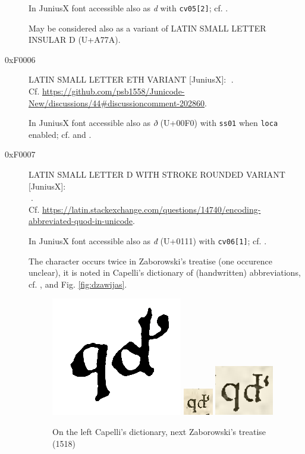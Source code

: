 \documentclass{article}
\newcommand{\Jglyph}[1]{{\relsize{2}\J#1}}
\begin{document}
\begin{description}
  In JuniusX font accessible also as \textit{d} with \texttt{cv05[2]};
  cf. \autocite[p. 7]{baker20:_opent_featur_junius_junius}.

  May be considered also as a variant of LATIN SMALL LETTER INSULAR D (U+A77A).
% 

\item [0xF0006] LATIN SMALL LETTER ETH VARIANT [JuniusX]: 
  \Jglyph{󰀆}.\\ Cf. \url{https://github.com/psb1558/Junicode-New/discussions/44#discussioncomment-202860}.

  In JuniusX font accessible also as \textit{ð} (U+00F0) with
  \texttt{ss01} when \texttt{loca} enabled;
  cf. \autocite[p. 11]{baker20:_opent_featur_junius_junius} and
  \autocite[p. 4 (30)]{kenmcd20:_junius_user_guide_first_draft}.

\item [0xF0007] LATIN SMALL LETTER D WITH STROKE ROUNDED VARIANT [JuniusX]:\\
  \Jglyph{󰀇}.\\
  Cf. \url{https://latin.stackexchange.com/questions/14740/encoding-abbreviated-quod-in-unicode}.

    In JuniusX font accessible also as \textit{đ}  (U+0111) with \texttt{cv06[1]};
  cf. \autocite[p. 7]{baker20:_opent_featur_junius_junius}.

  The character occurs twice in Zaborowski's treatise (one occurence
  unclear), it is noted in Capelli's dictionary of (handwritten)
  abbreviations, cf. \autocite{bień20:_trakt_stanis_zabor},
  \autocite[s. 307]{cappelli28:_lexic_wörter_abkür} and
  Fig. \vref{fig:dzawijas}.

  \begin{figure}
    \centering
    \includegraphics[height=06ex]{img/27a-0_Capelli307quod}
    \includegraphics[height=06ex]{img/27a-1_Zaborowski_Polona03_quod}
    \includegraphics[height=06ex]{img/27a-2_Zaborowski_Polona08_quod}
    \caption{On the left Capelli's dictionary, next Zaborowski's treatise (1518)}
    \label{fig:dzawijas}
  \end{figure}


\end{description}
\end{document}
